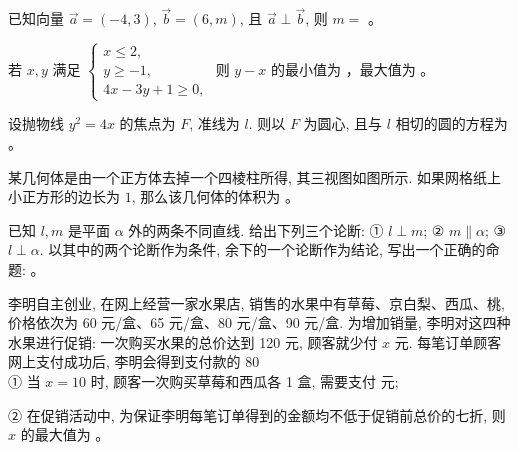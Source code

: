 \begin{question}
已知向量 $\vec{a} = (-4, 3)$, $\vec{b} = (6, m)$, 且 $\vec{a} \perp \vec{b}$, 则 $m =$ \gkblank{}。

\end{question}
\begin{question}
若 $x, y$ 满足 $\begin{cases} x \leqslant 2, \\ y \geqslant -1, \\ 4x - 3y + 1 \geqslant 0, \end{cases}$ 则 $y - x$ 的最小值为 \gkblank{}，最大值为 \gkblank{}。

\end{question}
\begin{question}
设抛物线 $y^2 = 4x$ 的焦点为 $F$, 准线为 $l$. 则以 $F$ 为圆心, 且与 $l$ 相切的圆的方程为 \gkblank{}。

\Needspace{0.4\textheight}
\end{question}
\begin{question}
某几何体是由一个正方体去掉一个四棱柱所得, 其三视图如图所示. 如果网格纸上小正方形的边长为 $1$, 那么该几何体的体积为 \gkblank{}。
\nopagebreak[4]
\begin{center}\end{center}
\nopagebreak[4]
\end{question}
\begin{question}
已知 $l, m$ 是平面 $\alpha$ 外的两条不同直线. 给出下列三个论断:
① $l \perp m$;
② $m \parallel \alpha$;
③ $l \perp \alpha$.
以其中的两个论断作为条件, 余下的一个论断作为结论, 写出一个正确的命题: \gkblank{}。

\end{question}
\begin{question}
李明自主创业, 在网上经营一家水果店, 销售的水果中有草莓、京白梨、西瓜、桃, 价格依次为 60 元/盒、65 元/盒、80 元/盒、90 元/盒. 为增加销量, 李明对这四种水果进行促销: 一次购买水果的总价达到 120 元, 顾客就少付 $x$ 元. 每笔订单顾客网上支付成功后, 李明会得到支付款的 80\\%

① 当 $x = 10$ 时, 顾客一次购买草莓和西瓜各 1 盒, 需要支付 \gkblank{} 元;

② 在促销活动中, 为保证李明每笔订单得到的金额均不低于促销前总价的七折, 则 $x$ 的最大值为 \gkblank{}。

\par\medskip

\end{question}

